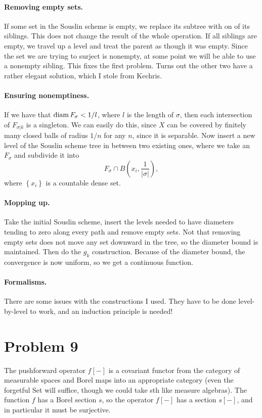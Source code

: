 \paragraph{Removing empty sets.} If some set in the Souslin scheme is empty, we replace its subtree with on of its siblings. This does not change the result of the whole operation. If all siblings are empty, we travel up a level and treat the parent as though it was empty. Since the set we are trying to surject is nonempty, at some point we will be able to use a nonempty sibling. This fixes the first problem. Turns out the other two have a rather elegant solution, which I stole from Kechris. 

\paragraph{Ensuring nonemptiness.} 
If we have that \( \operatorname{diam} F_\sigma < 1/l \), where \( l \) is the length of \( \sigma \), then each intersection of \( F_{\sigma | k} \) is a singleton.
We can easily do this, since \( X \) can be covered by finitely many closed balls of radius \( 1/n \) for any \( n \), since it is separable. Now insert a new level of the Souslin scheme tree in between two existing ones, where we take an \( F_\sigma \) and subdivide it into
\[ 
    F_{\sigma} \cap B \left( x_i, \frac{1}{|\sigma |} \right),
\]
where \( \left\{ x_i \right\} \) is a countable dense set.

\paragraph{Mopping up.} Take the initial Souslin scheme, insert the levels needed to have diameters tending to zero along every path and remove empty sets. Not that removing empty sets does not move any set downward in the tree, so the diameter bound is maintained. Then do the \( g_k \) construction. Because of the diameter bound, the convergence is now uniform, so we get a continuous function.

\paragraph{Formalisms.} There are some issues with the constructions I used. They have to be done level-by-level to work, and an induction principle is needed!

\section*{Problem 9}

The pushforward operator \( f[ - ] \) is a covariant functor from the category of measurable spaces and Borel maps into an appropriate category (even the forgetful {\sffamily Set} will suffice, though we could take sth like measure algebras). The function \( f \) has a Borel section \( s \), so the operator \( f[ - ] \) has a section \( s[ - ] \), and in particular it must be surjective.
